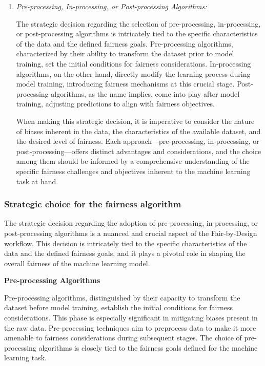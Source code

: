 \begin{enumerate}
    \item \emph{Pre-processing, In-processing, or Post-processing Algorithms:} 
    
    The strategic decision regarding the selection of pre-processing, in-processing, or post-processing algorithms is intricately tied to the specific characteristics of the data and the defined fairness goals. Pre-processing algorithms, characterized by their ability to transform the dataset prior to model training, set the initial conditions for fairness considerations. In-processing algorithms, on the other hand, directly modify the learning process during model training, introducing fairness mechanisms at this crucial stage. Post-processing algorithms, as the name implies, come into play after model training, adjusting predictions to align with fairness objectives.

    When making this strategic decision, it is imperative to consider the nature of biases inherent in the data, the characteristics of the available dataset, and the desired level of fairness. Each approach—pre-processing, in-processing, or post-processing—offers distinct advantages and considerations, and the choice among them should be informed by a comprehensive understanding of the specific fairness challenges and objectives inherent to the machine learning task at hand.

\end{enumerate}

\subsubsection{Strategic choice for the fairness algorithm}

The strategic decision regarding the adoption of pre-processing, in-processing, or post-processing algorithms is a nuanced and crucial aspect of the Fair-by-Design workflow. This decision is intricately tied to the specific characteristics of the data and the defined fairness goals, and it plays a pivotal role in shaping the overall fairness of the machine learning model.

\textbf{Pre-processing Algorithms}

Pre-processing algorithms, distinguished by their capacity to transform the dataset before model training, establish the initial conditions for fairness considerations. This phase is especially significant in mitigating biases present in the raw data. Pre-processing techniques aim to preprocess data to make it more amenable to fairness considerations during subsequent stages. The choice of pre-processing algorithms is closely tied to the fairness goals defined for the machine learning task.


